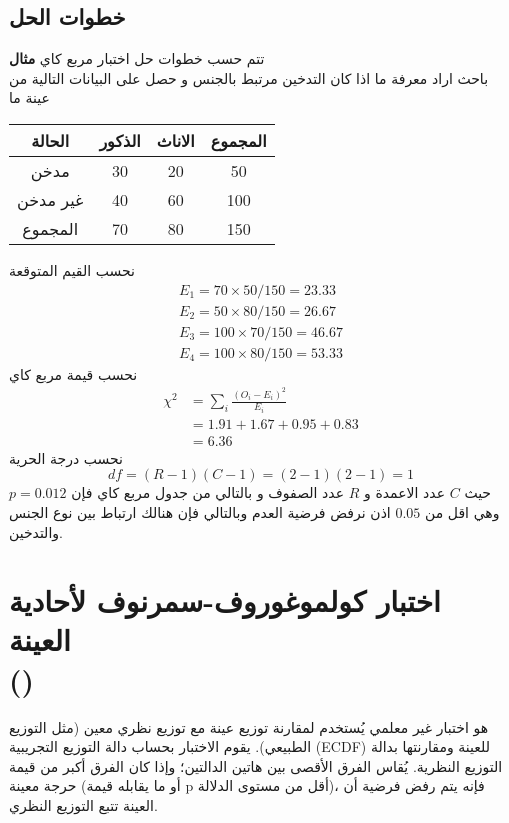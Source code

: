 \subsection*{خطوات الحل}
تتم حسب خطوات حل اختبار مربع كاي
\newpage
\noindent
\textbf{مثال}\\
باحث اراد معرفة ما اذا كان التدخين مرتبط بالجنس و حصل على البيانات التالية من عينة ما\\
\begin{table}[H]
	\centering
	\begin{tabular}{|c|c|c|c|}
		\hline
		الحالة & الذكور & الاناث & المجموع\\
		\hline
		مدخن & 30 & 20 & 50\\
		\hline
		غير مدخن & 40 & 60 & 100\\
		\hline
		المجموع & 70 & 80 & 150\\
		\hline
	\end{tabular}
\end{table}
نحسب القيم المتوقعة
\begin{align*}
	E_1 = 70\times 50 / 150 = 23.33\\
	E_2 = 50\times80/ 150 = 26.67\\
	E_3 = 100\times 70/ 150 = 46.67\\
	E_4 = 100\times 80 /150 = 53.33
\end{align*}
نحسب قيمة مربع كاي 
\begin{align*}
	\chi^2 & = \sum_i \frac{(O_i - E_i)^2}{E_i} \\
	&= 1.91 + 1.67 + 0.95 + 0.83\\
	&= 6.36
\end{align*}
نحسب درجة الحرية
\[
df = (R-1)(C-1) = (2-1)(2-1) = 1
\]
حيث $C$ عدد الاعمدة و $R$ عدد الصفوف و بالتالي من جدول مربع كاي فإن $p = 0.012$ وهي اقل من $0.05$ اذن نرفض فرضية العدم وبالتالي فإن هنالك ارتباط بين نوع الجنس والتدخين. 

\section{اختبار كولموغوروف-سمرنوف لأحادية العينة \\()}
هو اختبار غير معلمي يُستخدم لمقارنة توزيع عينة مع توزيع نظري معين (مثل التوزيع الطبيعي). يقوم الاختبار بحساب دالة التوزيع التجريبية (ECDF) للعينة ومقارنتها بدالة التوزيع النظرية. يُقاس الفرق الأقصى بين هاتين الدالتين؛ وإذا كان الفرق أكبر من قيمة حرجة معينة (أو ما يقابله قيمة p أقل من مستوى الدلالة)، فإنه يتم رفض فرضية أن العينة تتبع التوزيع النظري.

